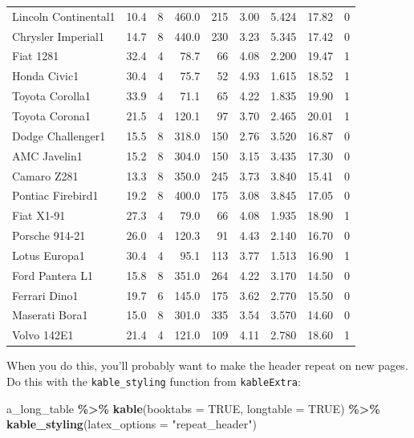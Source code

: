 \documentclass[a4paper, twoside]{templates/ociamthesis}
\newenvironment{Shaded}{\begin{snugshade}}{\end{snugshade}}
\newcommand{\DataTypeTok}[1]{\textcolor[rgb]{0.13,0.29,0.53}{#1}}
\newcommand{\KeywordTok}[1]{\textcolor[rgb]{0.13,0.29,0.53}{\textbf{#1}}}
\newcommand{\NormalTok}[1]{#1}
\newcommand{\OperatorTok}[1]{\textcolor[rgb]{0.81,0.36,0.00}{\textbf{#1}}}
\newcommand{\OtherTok}[1]{\textcolor[rgb]{0.56,0.35,0.01}{#1}}
\newcommand{\StringTok}[1]{\textcolor[rgb]{0.31,0.60,0.02}{#1}}
\renewenvironment{Shaded}
{
  \vspace{10pt}%
  \begin{snugshade}%
}{%
  \end{snugshade}%
  \vspace{8pt}%
}
\theoremstyle{definition}
\theoremstyle{definition}
\theoremstyle{definition}
\theoremstyle{definition}
\theoremstyle{remark}
\begin{document}
\begin{longtable}{lrrrrrrrr}
Lincoln Continental1 & 10.4 & 8 & 460.0 & 215 & 3.00 & 5.424 & 17.82 & 0\\
Chrysler Imperial1 & 14.7 & 8 & 440.0 & 230 & 3.23 & 5.345 & 17.42 & 0\\
Fiat 1281 & 32.4 & 4 & 78.7 & 66 & 4.08 & 2.200 & 19.47 & 1\\
\addlinespace
Honda Civic1 & 30.4 & 4 & 75.7 & 52 & 4.93 & 1.615 & 18.52 & 1\\
Toyota Corolla1 & 33.9 & 4 & 71.1 & 65 & 4.22 & 1.835 & 19.90 & 1\\
Toyota Corona1 & 21.5 & 4 & 120.1 & 97 & 3.70 & 2.465 & 20.01 & 1\\
Dodge Challenger1 & 15.5 & 8 & 318.0 & 150 & 2.76 & 3.520 & 16.87 & 0\\
AMC Javelin1 & 15.2 & 8 & 304.0 & 150 & 3.15 & 3.435 & 17.30 & 0\\
\addlinespace
Camaro Z281 & 13.3 & 8 & 350.0 & 245 & 3.73 & 3.840 & 15.41 & 0\\
Pontiac Firebird1 & 19.2 & 8 & 400.0 & 175 & 3.08 & 3.845 & 17.05 & 0\\
Fiat X1-91 & 27.3 & 4 & 79.0 & 66 & 4.08 & 1.935 & 18.90 & 1\\
Porsche 914-21 & 26.0 & 4 & 120.3 & 91 & 4.43 & 2.140 & 16.70 & 0\\
Lotus Europa1 & 30.4 & 4 & 95.1 & 113 & 3.77 & 1.513 & 16.90 & 1\\
\addlinespace
Ford Pantera L1 & 15.8 & 8 & 351.0 & 264 & 4.22 & 3.170 & 14.50 & 0\\
Ferrari Dino1 & 19.7 & 6 & 145.0 & 175 & 3.62 & 2.770 & 15.50 & 0\\
Maserati Bora1 & 15.0 & 8 & 301.0 & 335 & 3.54 & 3.570 & 14.60 & 0\\
Volvo 142E1 & 21.4 & 4 & 121.0 & 109 & 4.11 & 2.780 & 18.60 & 1\\
\bottomrule
\end{longtable}

When you do this, you'll probably want to make the header repeat on new pages.
Do this with the \texttt{kable\_styling} function from \texttt{kableExtra}:

\begin{Shaded}
\begin{Highlighting}[]
\NormalTok{a\_long\_table }\OperatorTok{\%\textgreater{}\%}\StringTok{ }
\StringTok{  }\KeywordTok{kable}\NormalTok{(}\DataTypeTok{booktabs =} \OtherTok{TRUE}\NormalTok{, }\DataTypeTok{longtable =} \OtherTok{TRUE}\NormalTok{) }\OperatorTok{\%\textgreater{}\%}\StringTok{ }
\StringTok{  }\KeywordTok{kable\_styling}\NormalTok{(}\DataTypeTok{latex\_options =} \StringTok{"repeat\_header"}\NormalTok{)}
\end{Highlighting}
\end{Shaded}
\end{document}
